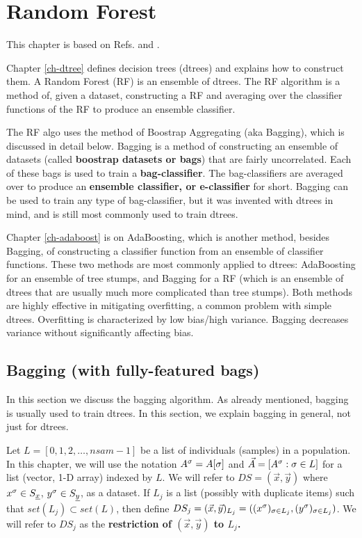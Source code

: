 \chapter{Random Forest}
\label{ch-rforest}


This chapter
is based on Refs.\cite{wiki-bagging}
and \cite{wiki-rforest}.

Chapter \ref{ch-dtree}
defines decision trees (dtrees)
and explains how to construct them.
A Random Forest (RF) is 
an ensemble
of dtrees.
The RF algorithm is a
method of,
given a dataset,
constructing a RF
and averaging
over the classifier 
functions of the RF
to produce
an ensemble classifier.


The RF algo
uses  the method of 
Boostrap Aggregating
(aka Bagging), which 
is discussed in detail below.
Bagging
is a method
of constructing
an ensemble
of datasets (called {\bf boostrap
datasets or bags})
that are 
fairly uncorrelated.
Each of
these bags is used to
train a {\bf bag-classifier}.
The bag-classifiers
are averaged over
to produce an {\bf
ensemble classifier,
or e-classifier} for short.
Bagging can be used
to
train any type
of bag-classifier,
but it was 
invented with
dtrees
in mind, 
and is still
 most commonly
used to train dtrees.

Chapter \ref{ch-adaboost}
is on AdaBoosting,
which is 
another method,
besides Bagging,
of constructing a classifier function
from an ensemble 
of classifier functions.
These two methods are most commonly
applied to dtrees: AdaBoosting for an ensemble of
tree stumps, and Bagging for a 
RF (which
is an ensemble
of dtrees that are 
usually much more
complicated than tree stumps).
 Both methods 
 are highly effective
in mitigating overfitting,
a common problem with simple
dtrees.
Overfitting
is characterized by 
low bias/high variance.
Bagging decreases variance
without
significantly
affecting bias.



\section{Bagging (with fully-featured bags)}
In this section
we discuss the bagging
algorithm.
As already 
mentioned,
bagging
is usually
used to train dtrees.
In this
section,
we explain bagging
in general,
not just for dtrees.


Let $L=[0,1,2, \ldots, nsam-1]$ be a list of
individuals (samples) in a population.
In this chapter, we will use the notation 
$A^\sigma=A[\sigma]$ 
and $\vec{A}=[A^\sigma:\sigma\in L]$
for a  list (vector, 1-D  array) indexed by $L$.
We will refer to $DS=(\vec{x}, \vec{y})$ 
where $x^\sigma\in S_{\underline{x}}$, $y^\sigma\in S_{\underline{y}}$,
as a dataset. If
$L_j$ is a list (possibly with 
duplicate items)
such that $set(L_j)\subset set(L)$,
 then
define
$DS_j=(\vec{x}, \vec{y})_{L_j}=
((x^\sigma)_{\sigma\in L_j}, 
(y^\sigma)_{\sigma\in L_j})$.
We will
refer to $DS_j$
as the {\bf restriction of 
$(\vec{x}, \vec{y})$ to $L_j$.}



